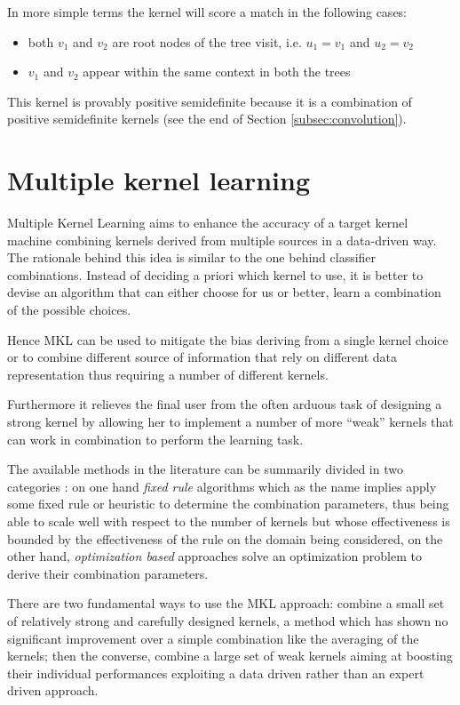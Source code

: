 In more simple terms the kernel will score a match in the following cases:
\begin{itemize}
    \item both $v_1$ and $v_2$ are root nodes of the tree visit, i.e. $u_1 = v_1$ and $u_2 = v_2$
    \item $v_1$ and $v_2$ appear within the same context in both the trees
\end{itemize}

This kernel is provably positive semidefinite because it is a combination of positive
semidefinite kernels (see the end of Section \ref{subsec:convolution}).

\section{Multiple kernel learning}
\label{subsec:mkl}
Multiple Kernel Learning aims to enhance the accuracy of a target kernel machine
combining kernels derived from multiple sources in a data-driven way.
The rationale behind this idea is similar to the one behind classifier combinations.
Instead of deciding a priori which kernel to use, it is better to devise an
algorithm that can either choose for us or better, learn a combination of the
possible choices.

Hence MKL can be used to mitigate the bias deriving from a single kernel choice
or to combine different source of information that rely on different data representation
thus requiring a number of different kernels.

Furthermore it relieves the final user from the often arduous task of designing
a strong kernel by allowing her to implement a number of more ``weak'' kernels
that can work in combination to perform the learning task.

The available methods in the literature can be summarily divided in two categories
\cite{journals/jmlr/GonenA11}: on one hand \emph{fixed rule} algorithms which as the name implies apply some fixed
rule or heuristic to determine the combination parameters, thus being able to scale
well with respect to the number of kernels but whose effectiveness is bounded by
the effectiveness of the rule on the domain being considered,
on the other hand, \emph{optimization based} approaches solve an optimization
problem to derive their combination parameters.

There are two fundamental ways to use the MKL approach: combine a small set of 
relatively strong and carefully designed kernels, a method which has shown no
significant improvement over a simple combination like the averaging of the kernels;
then the converse, combine a large set of weak kernels aiming at boosting their
individual performances exploiting a data driven rather than an expert driven
approach.

